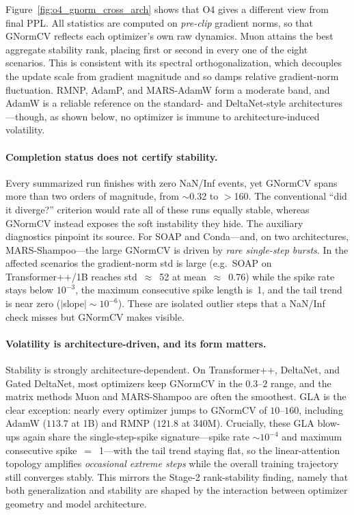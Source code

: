 Figure~\ref{fig:o4_gnorm_cross_arch} shows that O4 gives a different view from
final PPL. All statistics are computed on \emph{pre-clip} gradient norms, so
that GNormCV reflects each optimizer's own raw dynamics. Muon attains the best aggregate stability rank, placing first or
second in every one of the eight scenarios. This is consistent with its
spectral orthogonalization, which decouples the update scale from gradient
magnitude and so damps relative gradient-norm fluctuation. RMNP, AdamP, and
MARS-AdamW form a moderate band, and AdamW is a reliable reference on the
standard- and DeltaNet-style architectures---though, as shown below, no
optimizer is immune to architecture-induced volatility.

\paragraph{Completion status does not certify stability.}
Every summarized run finishes with zero NaN/Inf events, yet GNormCV spans more
than two orders of magnitude, from $\sim$0.32 to $>$160. The conventional
``did it diverge?'' criterion would rate all of these runs equally stable, whereas
GNormCV instead exposes the soft instability they hide. The auxiliary
diagnostics pinpoint its source. For SOAP and Conda---and, on two
architectures, MARS-Shampoo---the large GNormCV is driven by \emph{rare
single-step bursts}. In the affected scenarios the
gradient-norm std is large (e.g.\ SOAP on Transformer++/1B reaches
std~$\approx$~52 at mean~$\approx$~0.76) while the spike rate stays below
$10^{-3}$, the maximum consecutive spike length is~1, and the tail trend is
near zero ($|$slope$|\!\sim\!10^{-6}$). These are isolated outlier steps that a
NaN/Inf check misses but GNormCV makes visible.

\paragraph{Volatility is architecture-driven, and its form matters.}
Stability is strongly architecture-dependent. On Transformer++, DeltaNet, and
Gated DeltaNet, most optimizers keep GNormCV in the $0.3$--$2$ range, and the
matrix methods Muon and MARS-Shampoo are often the smoothest. GLA is the clear
exception: nearly every optimizer jumps to GNormCV of $10$--$160$, including
AdamW ($113.7$ at 1B) and RMNP ($121.8$ at 340M). Crucially, these GLA blow-ups
again share the single-step-spike signature---spike rate $\sim\!10^{-4}$ and
maximum consecutive spike~$=$~1---with the tail trend staying flat, so the
linear-attention topology amplifies \emph{occasional extreme steps} while the
overall training trajectory still converges stably. This mirrors the Stage-2 rank-stability
finding, namely that both generalization and stability are shaped by the interaction
between optimizer geometry and model architecture.

